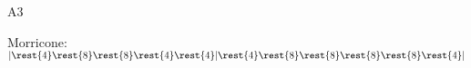 \documentclass[timestamp]{jazzgrid}
\begin{document}
\begin{musicsection}{A3}
\barline
	{}
	{}
	{}
	{}
\barline
	{}
	{}
	{}
	{}
\end{musicsection}

\raggedright
\tiny{Morricone: }\normalsize  $|\rest{4}\rest{8}\rest{8}\rest{4}\rest{4}|\rest{4}\rest{8}\rest{8}\rest{8}\rest{8}\rest{4}|$
\end{document}
